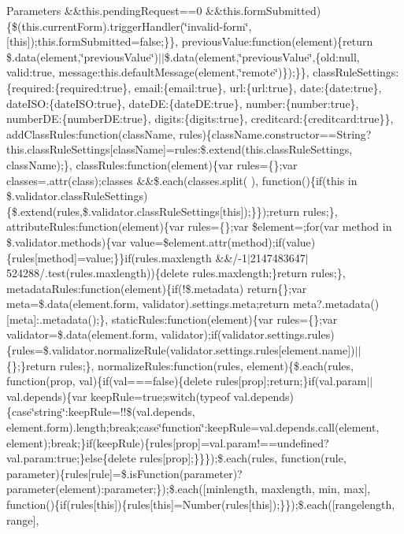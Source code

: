 {\begin{DoxyParams}{Parameters}
\&\&this.\+pending\+Request==0 \&\&this.\+form\+Submitted)\{\$(this.\+current\+Form).trigger\+Handler(\char`\"{}invalid-\/form\char`\"{}, \mbox{[}this\mbox{]});this.\+form\+Submitted=false;\}\}, previous\+Value\+:function(element)\{return \$.data(element,\char`\"{}previous\+Value\char`\"{})$\vert$$\vert$\$.data(element,\char`\"{}previous\+Value\char`\"{},\{old\+:null, valid\+:true, message\+:this.\+default\+Message(element,\char`\"{}remote\char`\"{})\});\}\}, class\+Rule\+Settings\+:\{required\+:\{required\+:true\}, email\+:\{email\+:true\}, url\+:\{url\+:true\}, date\+:\{date\+:true\}, date\+I\+SO\+:\{date\+I\+SO\+:true\}, date\+DE\+:\{date\+DE\+:true\}, number\+:\{number\+:true\}, number\+DE\+:\{number\+DE\+:true\}, digits\+:\{digits\+:true\}, creditcard\+:\{creditcard\+:true\}\}, add\+Class\+Rules\+:function(class\+Name, rules)\{class\+Name.\+constructor==String?this.\+class\+Rule\+Settings\mbox{[}class\+Name\mbox{]}=rules\+:\$.extend(this.\+class\+Rule\+Settings, class\+Name);\}, class\+Rules\+:function(element)\{var rules=\{\};var classes=.attr(\textquotesingle{}class\textquotesingle{});classes \&\&\$.each(classes.\+split(\textquotesingle{} \textquotesingle{}), function()\{if(this in \$.validator.\+class\+Rule\+Settings)\{\$.extend(rules,\$.validator.\+class\+Rule\+Settings\mbox{[}this\mbox{]});\}\});return rules;\}, attribute\+Rules\+:function(element)\{var rules=\{\};var \$element=;for(var method in \$.validator.\+methods)\{var value=\$element.\+attr(method);if(value)\{rules\mbox{[}method\mbox{]}=value;\}\}if(rules.\+maxlength \&\&/-\/1$\vert$2147483647$\vert$524288/.test(rules.\+maxlength))\{delete rules.\+maxlength;\}return rules;\}, metadata\+Rules\+:function(element)\{if(!\$.metadata) return\{\};var meta=\$.data(element.\+form, \textquotesingle{}validator\textquotesingle{}).settings.\+meta;return meta?.metadata()\mbox{[}meta\mbox{]}\+:.metadata();\}, static\+Rules\+:function(element)\{var rules=\{\};var validator=\$.data(element.\+form, \textquotesingle{}validator\textquotesingle{});if(validator.\+settings.\+rules)\{rules=\$.validator.\+normalize\+Rule(validator.\+settings.\+rules\mbox{[}element.\+name\mbox{]})$\vert$$\vert$\{\};\}return rules;\}, normalize\+Rules\+:function(rules, element)\{\$.each(rules, function(prop, val)\{if(val===false)\{delete rules\mbox{[}prop\mbox{]};return;\}if(val.\+param$\vert$$\vert$val.depends)\{var keep\+Rule=true;switch(typeof val.\+depends)\{case\char`\"{}string\char`\"{}\+:keep\+Rule=!!\$(val.\+depends, element.\+form).length;break;case\char`\"{}function\char`\"{}\+:keep\+Rule=val.\+depends.\+call(element, element);break;\}if(keep\+Rule)\{rules\mbox{[}prop\mbox{]}=val.\+param!==undefined?val.\+param\+:true;\}else\{delete rules\mbox{[}prop\mbox{]};\}\}\});\$.each(rules, function(rule, parameter)\{rules\mbox{[}rule\mbox{]}=\$.is\+Function(parameter)?parameter(element)\+:parameter;\});\$.each(\mbox{[}\textquotesingle{}minlength\textquotesingle{}, \textquotesingle{}maxlength\textquotesingle{}, \textquotesingle{}min\textquotesingle{}, \textquotesingle{}max\textquotesingle{}\mbox{]}, function()\{if(rules\mbox{[}this\mbox{]})\{rules\mbox{[}this\mbox{]}=Number(rules\mbox{[}this\mbox{]});\}\});\$.each(\mbox{[}\textquotesingle{}rangelength\textquotesingle{}, \textquotesingle{}range\textquotesingle{}\mbox{]}, 
\end{DoxyParams}}
